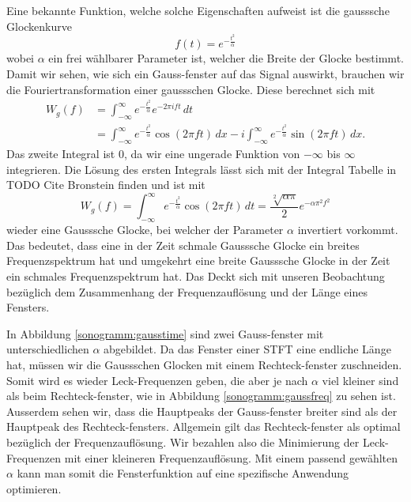 Eine bekannte Funktion, welche solche Eigenschaften aufweist ist die gausssche Glockenkurve
\begin{equation}
    f(t) = e^{-\frac{t^2}{\alpha}}
\end{equation}
wobei $\alpha$ ein frei wählbarer Parameter ist, welcher die Breite der Glocke 
bestimmt.
Damit wir sehen, wie sich ein Gauss-fenster auf das Signal auswirkt, brauchen wir
die Fouriertransformation einer gaussschen Glocke.
Diese berechnet sich mit 
\begin{align}
    W_g(f) &= \int_{-\infty}^{\infty} e^{-\frac{t^2}{\alpha}} e^{- 2 \pi i f t}\, dt\\
    &= \int_{-\infty}^{\infty} e^{-\frac{t^2}{\alpha}} \cos(2 \pi f t)\, dx -
    i \int_{-\infty}^{\infty} e^{-\frac{t^2}{\alpha}} \sin(2 \pi f t)\, dx .
\end{align}
Das zweite Integral ist 0, da wir eine ungerade Funktion von $-\infty$ bis $\infty$ integrieren.
Die Lösung des ersten Integrals lässt sich mit der Integral Tabelle in TODO Cite Bronstein finden und ist mit
\begin{equation}
    W_g(f) = \int_{-\infty}^{\infty} e^{-\frac{t^2}{\alpha}} \cos(2 \pi f t)\, dt =
    \frac{\sqrt[2]{\alpha \pi}}{2} e^{-\alpha \pi^2 f^2}
\end{equation}
wieder eine Gausssche Glocke, bei welcher der Parameter $\alpha$ invertiert vorkommt.
Das bedeutet, dass eine in der Zeit schmale Gausssche Glocke ein breites Frequenzspektrum hat und umgekehrt eine
breite Gausssche Glocke in der Zeit ein schmales Frequenzspektrum hat.
Das Deckt sich mit unseren Beobachtung bezüglich dem Zusammenhang der 
Frequenzauflösung und der Länge eines Fensters.

In Abbildung \ref{sonogramm:gausstime} sind zwei Gauss-fenster mit unterschiedlichen 
$\alpha$ abgebildet.
Da das Fenster einer STFT eine endliche Länge hat, müssen wir die Gaussschen Glocken 
mit einem Rechteck-fenster zuschneiden. 
Somit wird es wieder Leck-Frequenzen geben, die aber je nach $\alpha$ viel kleiner sind
als beim Rechteck-fenster, wie in Abbildung \ref{sonogramm:gaussfreq} zu sehen ist.
Ausserdem sehen wir, dass die Hauptpeaks der Gauss-fenster breiter sind als der 
Hauptpeak des Rechteck-fensters.
Allgemein gilt das Rechteck-fenster als optimal bezüglich der Frequenzauflösung.
Wir bezahlen also die Minimierung der Leck-Frequenzen mit einer kleineren Frequenzauflösung. 
Mit einem passend gewählten $\alpha$ kann man somit die Fensterfunktion auf eine spezifische
Anwendung optimieren.

